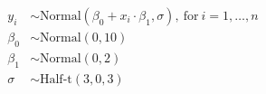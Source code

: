 \documentclass[10pt]{article}
\begin{document}
\begin{align*}y_i &\sim \mathrm{Normal}(\beta_0 + x_i \cdot \beta_1, \sigma), \ \text{for}\ i = 1, \ldots, n\\
\beta_0 &\sim \mathrm{Normal}(0, 10)\\
\beta_1 &\sim \mathrm{Normal}(0, 2)\\
\sigma &\sim \text{Half-t}(3, 0, 3)\end{align*}
\end{document}
